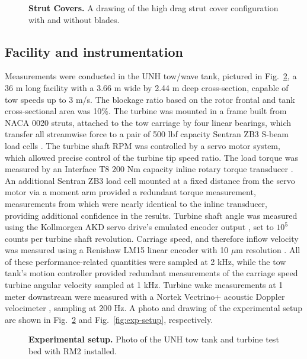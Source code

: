 \documentclass[10pt,letterpaper]{article}
\begin{document}
\begin{figure}

    \caption{{\bf Strut Covers.} A drawing of the high drag strut cover
        configuration with and without blades.}

    \label{fig:covers}
\end{figure}


\subsection*{Facility and instrumentation}

Measurements were conducted in the UNH tow/wave tank, pictured in
Fig.~\ref{fig:exp-setup-photo}, a 36 m long facility with a 3.66 m wide by 2.44
m deep cross-section, capable of tow speeds up to 3 m/s. The blockage ratio
based on the rotor frontal and tank cross-sectional area was 10\%. The turbine
was mounted in a frame built from NACA 0020 struts, attached to the tow carriage
by four linear bearings, which transfer all streamwise force to a pair of 500
lbf capacity Sentran ZB3 S-beam load cells \cite{SentranZB}. The turbine shaft
RPM was controlled by a servo motor system, which allowed precise control of the
turbine tip speed ratio. The load torque was measured by an Interface T8 200 Nm
capacity inline rotary torque transducer \cite{InterfaceT8}. An additional
Sentran ZB3 load cell mounted at a fixed distance from the servo motor via a
moment arm provided a redundant torque measurement, measurements from which were
nearly identical to the inline transducer, providing additional confidence in
the results. Turbine shaft angle was measured using the Kollmorgen AKD servo
drive's emulated encoder output \cite{KollmorgenAKD}, set to $10^5$ counts per
turbine shaft revolution. Carriage speed, and therefore inflow velocity was
measured using a Renishaw LM15 linear encoder with 10 $\mu$m resolution
\cite{RenishawLM15}. All of these performance-related quantities were sampled at
2 kHz, while the tow tank's motion controller provided redundant measurements of
the carriage speed turbine angular velocity sampled at 1 kHz. Turbine wake
measurements at 1 meter downstream were measured with a Nortek Vectrino+
acoustic Doppler velocimeter \cite{NortekVectrino}, sampling at 200 Hz. A photo
and drawing of the experimental setup are shown in
Fig.~\ref{fig:exp-setup-photo} and Fig.~\ref{fig:exp-setup}, respectively.

\begin{figure}
    \centering


    \caption{\textbf{Experimental setup.} Photo of the UNH tow tank and turbine
    test bed with RM2 installed.}

    \label{fig:exp-setup-photo}
\end{figure}
\end{document}
